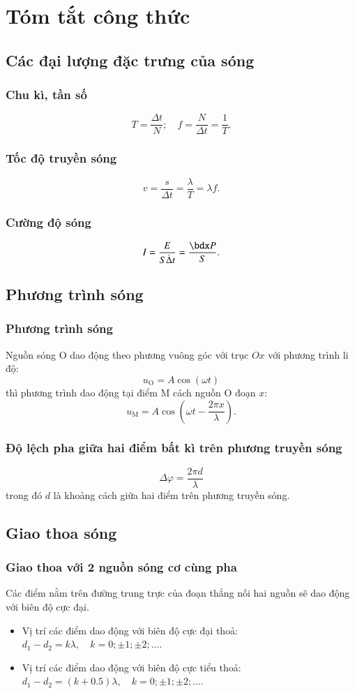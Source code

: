\chapter{Tóm tắt công thức}
\section{Các đại lượng đặc trưng của sóng}
\subsection{Chu kì, tần số}
$$T=\dfrac{\Delta t}{N};\quad f=\dfrac{N}{\Delta t}=\dfrac{1}{T}.$$
\subsection{Tốc độ truyền sóng}
$$v=\dfrac{s}{\Delta t}=\dfrac{\lambda}{T}=\lambda f.$$
\subsection{Cường độ sóng}
$$I=\dfrac{E}{S\dot \Delta t}=\dfrac{\calP}{S}.$$
\section{Phương trình sóng}
\subsection{Phương trình sóng}
Nguồn sóng O dao động theo phương vuông góc với trục $Ox$ với phương trình li độ:
$$u_\text{O}=A\cos\left(\omega t\right)$$
thì phương trình dao động tại điểm M cách nguồn O đoạn $x$:
$$u_\text{M}=A\cos\left(\omega t-\dfrac{2\pi x}{\lambda}\right).$$
\subsection{Độ lệch pha giữa hai điểm bất kì trên phương truyền sóng}
$$\Delta\varphi=\dfrac{2\pi d}{\lambda}$$
trong đó $d$ là khoảng cách giữa hai điểm trên phương truyền sóng.
\section{Giao thoa sóng}
\subsection{Giao thoa với 2 nguồn sóng cơ cùng pha}
Các điểm nằm trên đường trung trực của đoạn thẳng nối hai nguồn sẽ dao động với biên độ cực đại.
\begin{itemize}
	\item Vị trí các điểm dao động với biên độ cực đại thoả: $d_1-d_2=k\lambda, \quad k=0; \pm1; \pm2; \dots$.
	\item Vị trí các điểm dao động với biên độ cực tiểu thoả: $d_1-d_2=\left(k+0.5\right)\lambda, \quad k=0; \pm1; \pm2; \dots$.
\end{itemize}
